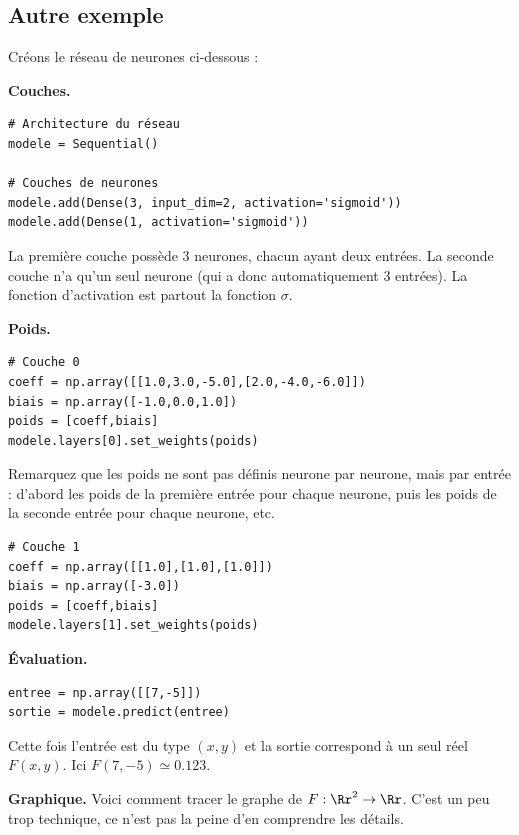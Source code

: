 \documentclass[11pt,class=report,crop=false]{standalone}
\begin{document}
\subsection{Autre exemple}

Créons le réseau de neurones ci-dessous :



\textbf{Couches.}
\begin{lstlisting}
# Architecture du réseau
modele = Sequential()

# Couches de neurones
modele.add(Dense(3, input_dim=2, activation='sigmoid'))
modele.add(Dense(1, activation='sigmoid'))
\end{lstlisting}

La première couche possède $3$ neurones, chacun ayant deux entrées.
La seconde couche n'a qu'un seul neurone (qui a donc automatiquement $3$ entrées). La fonction d'activation est partout la fonction $\sigma$.

\bigskip
\textbf{Poids.}


\begin{lstlisting}
# Couche 0
coeff = np.array([[1.0,3.0,-5.0],[2.0,-4.0,-6.0]])
biais = np.array([-1.0,0.0,1.0])
poids = [coeff,biais]
modele.layers[0].set_weights(poids)
\end{lstlisting}

Remarquez que les poids ne sont pas définis neurone par neurone, mais par entrée : d'abord les poids de la première entrée pour chaque neurone, puis les poids de la seconde entrée pour chaque neurone, etc.

\begin{lstlisting}
# Couche 1
coeff = np.array([[1.0],[1.0],[1.0]])
biais = np.array([-3.0])
poids = [coeff,biais]
modele.layers[1].set_weights(poids)
\end{lstlisting}

\bigskip
\textbf{Évaluation.}
\begin{lstlisting}
entree = np.array([[7,-5]])
sortie = modele.predict(entree)
\end{lstlisting}

Cette fois l'entrée est du type $(x,y)$ et la sortie correspond à un seul réel $F(x,y)$. Ici $F(7,-5) \simeq 0.123$.

\bigskip
\textbf{Graphique.}
Voici comment tracer le graphe de $F: \Rr^2 \to \Rr$. C'est un peu trop technique, ce n'est pas la peine d'en comprendre les détails.
\end{document}
